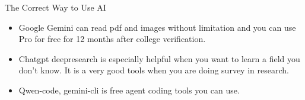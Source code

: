 \begin{frame}[fragile]{The Correct Way to Use AI}
    \begin{itemize}
			\item Google Gemini can read pdf and images without limitation and you can use Pro for free for 12 months after college verification.
			\item Chatgpt deepresearch is especially helpful when you want to learn a field you don't know. It is a very good tools when you are doing survey in research.
			\item Qwen-code, gemini-cli is free agent coding tools you can use.
    \end{itemize}
\end{frame}
